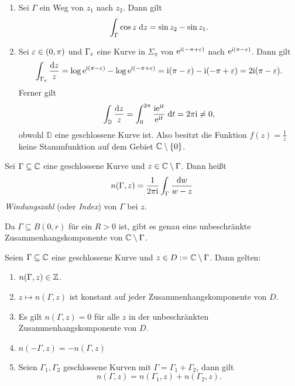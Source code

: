 \documentclass[a4paper,twoside,DIV15,BCOR12mm]{scrbook}
\begin{document}
\begin{bsp}
  \begin{enumerate}
  \item Sei $\Gamma$ ein Weg von $z_1$ nach $z_2$. Dann gilt
    \[\int_{\Gamma}^{}{\cos{z}}\;\mathrm{d} z = \sin{z_2}-\sin{z_1}.\]
  \item Sei $\varepsilon\in(0,\pi)$ und $\Gamma_\varepsilon$ eine Kurve in $\Sigma_\pi$ von $\mathrm{e}^{\mathrm{i}(-\pi+\varepsilon)}$ nach $\mathrm{e}^{\mathrm{i}(\pi-\varepsilon)}$. Dann
    gilt
    \[\int_{\Gamma_\varepsilon}{\frac{\mathrm{d} z}{z}} = \log{\mathrm{e}^{\mathrm{i}(\pi-\varepsilon)}} - \log{\mathrm{e}^{\mathrm{i}(-\pi+\varepsilon)}} = \mathrm{i}(\pi-\varepsilon) - \mathrm{i}(-\pi+\varepsilon)
    = 2\mathrm{i}(\pi-\varepsilon).\]
    Ferner gilt
    \[\int_{\mathbb{D}}{\frac{\mathrm{d} z}{z}} = \int_{0}^{2\pi}{\frac{\mathrm{i}\mathrm{e}^{\mathrm{i} t}}{\mathrm{e}^{\mathrm{i} t}}}\;\mathrm{d} t = 2\pi\mathrm{i} \neq 0,\]
    obwohl $\mathbb{D}$ eine geschlossene Kurve ist. Also besitzt die Funktion $f(z)=\frac1z$ keine Stammfunktion auf dem Gebiet
    $\mathbb{C}\setminus\{0\}$.
  \end{enumerate}
\end{bsp}

\begin{dfn}
  Sei $\Gamma\subseteq\mathbb{C}$ eine geschlossene Kurve und $z\in\mathbb{C}\setminus\Gamma$. Dann heißt
  \[ n(\Gamma,z) = \frac{1}{2\pi\mathrm{i}} \int_\Gamma{\frac{\mathrm{d}w}{w-z}} \]
  \emph{Windungszahl} (oder \emph{Index}) von $\Gamma$ bei $z$.
\end{dfn}


\begin{bem*} Da $\Gamma \subseteq B(0,r)$ für ein $R>0$ ist, gibt es genau eine unbeschränkte Zusammenhangskomponente von $\mathbb{C}\setminus\Gamma$.
\end{bem*}

\begin{satz}\label{satz2.16}
Seien $\Gamma \subseteq \mathbb{C}$ eine geschlossene Kurve und $z\in D:= \mathbb{C}\setminus\Gamma$. Dann gelten:
\begin{enumerate}
\item $n(\Gamma,z)\in\mathbb{Z}$.
\item $z\mapsto n(\Gamma,z)$ ist konstant auf jeder Zusammenhangskomponente von $D$.
\item Es gilt $n(\Gamma,z) = 0$ für alle $z$ in der unbeschränkten Zusammenhangskomponente von $D$.
\item $n(-\Gamma,z) = -n(\Gamma,z)$
\item Seien $\Gamma_1,\Gamma_2$ geschlossene Kurven mit $\Gamma = \Gamma_1 + \Gamma_2$, dann gilt
\[n(\Gamma,z) = n(\Gamma_1,z)+n(\Gamma_2,z).\]
\end{enumerate}
\end{satz}
\end{document}
